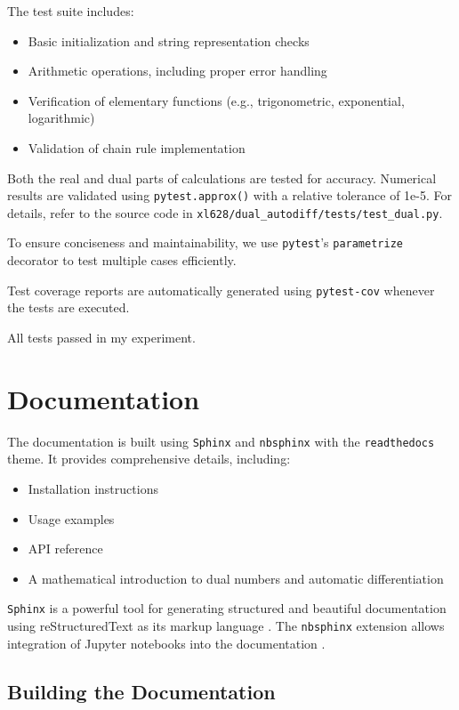 \documentclass{article}
\begin{document}
The test suite includes:

\begin{itemize} 
    \item Basic initialization and string representation checks \item Arithmetic operations, including proper error handling \item Verification of elementary functions (e.g., trigonometric, exponential, logarithmic) 
    \item Validation of chain rule implementation 
\end{itemize}

Both the real and dual parts of calculations are tested for accuracy. Numerical results are validated using \texttt{pytest.approx()} with a relative tolerance of 1e-5. For details, refer to the source code in \texttt{xl628/dual\_autodiff/tests/test\_dual.py}.

To ensure conciseness and maintainability, we use \texttt{pytest}'s \texttt{parametrize} decorator to test multiple cases efficiently.

Test coverage reports are automatically generated using \texttt{pytest-cov} whenever the tests are executed.

All tests passed in my experiment.

\section{Documentation}

The documentation is built using \texttt{Sphinx} and \texttt{nbsphinx} with the \texttt{readthedocs} theme. It provides comprehensive details, including:

\begin{itemize} 
    \item Installation instructions 
    \item Usage examples 
    \item API reference 
    \item A mathematical introduction to dual numbers and automatic differentiation 
\end{itemize}

\texttt{Sphinx} is a powerful tool for generating structured and beautiful documentation using reStructuredText as its markup language \cite{sphinx_pypi}. The \texttt{nbsphinx} extension allows integration of Jupyter notebooks into the documentation \cite{nbsphinx_docs}.

\subsection{Building the Documentation}
\end{document}
